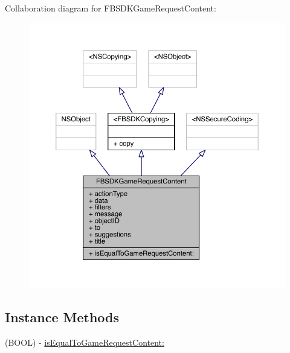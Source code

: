Collaboration diagram for F\-B\-S\-D\-K\-Game\-Request\-Content\-:
\nopagebreak
\begin{figure}[H]
\begin{center}
\leavevmode
\includegraphics[width=350pt]{interface_f_b_s_d_k_game_request_content__coll__graph}
\end{center}
\end{figure}
\subsection*{Instance Methods}
\begin{DoxyCompactItemize}
\item 
(B\-O\-O\-L) -\/ \hyperlink{interface_f_b_s_d_k_game_request_content_a1f622f3da8f3ff8e395b1d4802c96279}{is\-Equal\-To\-Game\-Request\-Content\-:}
\end{DoxyCompactItemize}
